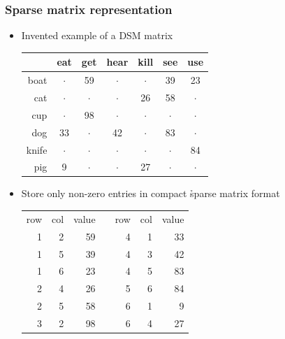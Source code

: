 \documentclass[t]{beamer} %
\begin{document}
\begin{frame}
  \frametitle{Sparse matrix representation}

  \ungap
  \begin{itemize}
  \item Invented example of a  DSM matrix
    \begin{center}\footnotesize
      \begin{tabular}{r | cccccc}
        & eat & get & hear & kill & see & use \\
        \midrule
        boat  &   $\cdot$  & 59  &   $\cdot$  &   $\cdot$  & 39 &  23 \\
        cat   &   $\cdot$  &  $\cdot$  &   $\cdot$  &  26  & 58 &   $\cdot$ \\
        cup   &   $\cdot$  & 98  &   $\cdot$  &   $\cdot$  &  $\cdot$ &   $\cdot$ \\
        dog   &  33  &  $\cdot$  &  42  &   $\cdot$  & 83 &   $\cdot$ \\
        knife &   $\cdot$  &  $\cdot$  &   $\cdot$  &   $\cdot$  &  $\cdot$ &  84 \\
        pig   &   9  &  $\cdot$  &   $\cdot$  &  27  &  $\cdot$ &   $\cdot$ 
      \end{tabular}
    \end{center}
    \gap\pause
  \item Store only non-zero entries in compact \h{sparse matrix format}
    \begin{center}\footnotesize
      \begin{tabular}{r|r|r c r|r|r}
        row & col & value && row & col & value \\
        \cline{1-3} \cline{5-7}
        1  &  2  &  59 &&  4  &  1  &  33 \\
        1  &  5  &  39 &&  4  &  3  &  42 \\
        1  &  6  &  23 &&  4  &  5  &  83 \\
        2  &  4  &  26 &&  5  &  6  &  84 \\
        2  &  5  &  58 &&  6  &  1  &   9 \\
        3  &  2  &  98 &&  6  &  4  &  27 \\
       \end{tabular}
    \end{center}
  \end{itemize}
\end{frame}
\end{document}
